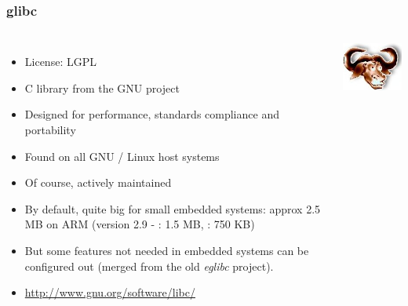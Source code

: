 \begin{frame}
  \frametitle{glibc}
  \begin{columns}
    \begin{itemize}
    \item License: LGPL
    \item C library from the GNU project
    \item Designed for performance, standards compliance and portability
    \item Found on all GNU / Linux host systems
    \item Of course, actively maintained
    \item By default, quite big for small embedded systems: approx 2.5 MB on ARM
      (version 2.9 - : 1.5 MB, : 750 KB)
    \item But some features not needed in embedded systems can be
          configured out (merged from the old {\em eglibc} project).
    \item \url{http://www.gnu.org/software/libc/}
    \end{itemize}
    \includegraphics[width=\textwidth]{slides/c-libraries/glibc.png}
  \end{columns}
\end{frame}

